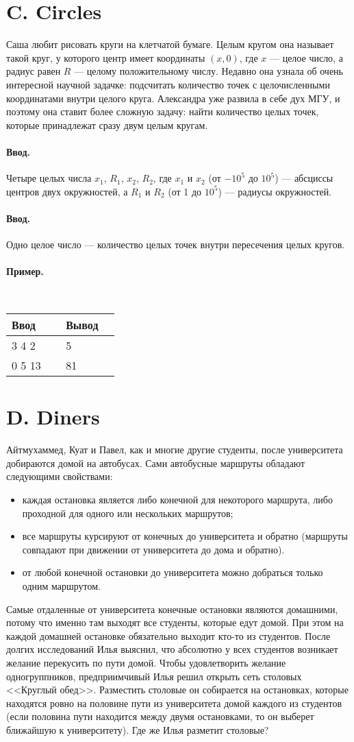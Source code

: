 \documentclass[12pt, a5paper]{article}
\newcommand{\informat}[1]
{
	\paragraph{Ввод.\\} #1
}
\newcommand{\examplee}[4]
{
	\paragraph{Пример.\\}
	{\tt
	\begin{tabular}{|p{0.4\linewidth}|p{0.4\linewidth}|}
	\hline
	Ввод 	& Вывод  	\\
	\hline
	#1 		& #2 		\\
	\hline
	#3		& #4		\\
	\hline
	\end{tabular}
	}
}
\begin{document}
\section*{C. Circles}

Саша любит рисовать круги на клетчатой бумаге. Целым кругом она называет такой круг, у которого центр имеет координаты $(x, 0)$, где $x$ --- целое число, а радиус равен $R$ --- целому положительному числу. Недавно она узнала об очень интересной научной задачке: подсчитать количество точек с целочисленными координатами внутри целого круга. Александра уже развила в себе дух МГУ, и поэтому она ставит более сложную задачу: найти количество целых точек, которые принадлежат сразу двум целым кругам.

\informat{Четыре целых числа $x_1$, $R_1$, $x_2$, $R_2$, где $x_1$ и $x_2$ (от $-10^5$ до $10^5$) --- абсциссы центров двух окружностей, а $R_1$ и $R_2$ (от 1 до $10^5$) --- радиусы окружностей.}
 
\informat{Одно целое число --- количество целых точек внутри пересечения целых кругов.}
 
\examplee{3 4 \newline -1 2}{5}{0 5 \newline 0 13}{81}
  
\section*{D. Diners}

Айтмухаммед, Куат и Павел, как и многие другие студенты, после университета добираются домой на автобусах. Сами автобусные маршруты обладают следующими свойствами: 
\begin{itemize}
\item каждая остановка является либо конечной для некоторого маршрута, либо проходной для одного или нескольких маршрутов;
\item все маршруты курсируют от конечных до университета и обратно (маршруты совпадают при движении от университета до дома и обратно).
\item от любой конечной остановки до университета можно добраться только одним маршрутом.
\end{itemize}
Самые отдаленные от университета конечные остановки являются домашними, потому что именно там выходят все студенты, которые едут домой. При этом на каждой домашней остановке обязательно выходит кто-то из студентов. После долгих исследований Илья выяснил, что абсолютно у всех студентов возникает желание перекусить по пути домой. Чтобы удовлетворить желание одногруппников, предприимчивый Илья решил открыть сеть столовых <<Круглый обед>>. Разместить столовые он собирается на остановках, которые находятся ровно на половине пути из университета домой каждого из студентов (если половина пути находится между двумя остановками, то он выберет ближайшую к университету). Где же Илья разметит столовые?
 
\end{document}
